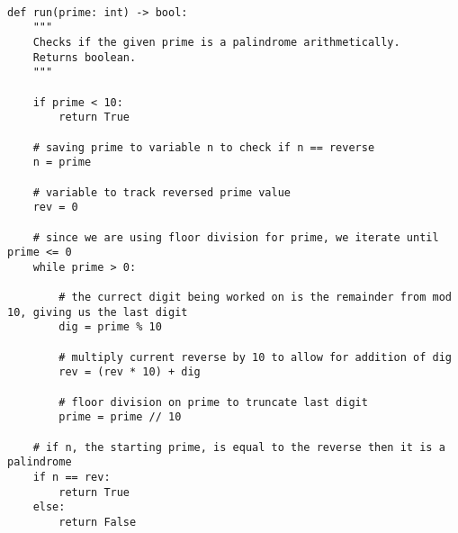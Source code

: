 \documentclass[11pt]{article}
\begin{document}
\newpage

\lstset{style = Palindromes}

\begin{lstlisting}

def run(prime: int) -> bool:
	"""
	Checks if the given prime is a palindrome arithmetically.
	Returns boolean.
	"""

	if prime < 10:
		return True

	# saving prime to variable n to check if n == reverse
	n = prime

	# variable to track reversed prime value
	rev = 0

	# since we are using floor division for prime, we iterate until prime <= 0
	while prime > 0:

		# the currect digit being worked on is the remainder from mod 10, giving us the last digit
		dig = prime % 10
		
		# multiply current reverse by 10 to allow for addition of dig
		rev = (rev * 10) + dig
		
		# floor division on prime to truncate last digit
		prime = prime // 10

	# if n, the starting prime, is equal to the reverse then it is a palindrome
	if n == rev:
		return True
	else:
		return False

\end{lstlisting}
\end{document}
